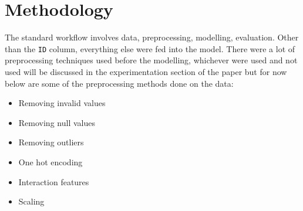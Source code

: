 \section{Methodology}


The standard workflow involves data, preprocessing, modelling, evaluation. Other than the \texttt{ID} column, everything else were fed into the model. There were a lot of preprocessing techniques used before the modelling, whichever were used and not used will be discussed in the experimentation section of the paper but for now below are some of the preprocessing methods done on the data:

\begin{itemize}
\item Removing invalid values
\item Removing null values
\item Removing outliers
\item One hot encoding
\item Interaction features
\item Scaling
\end{itemize}
